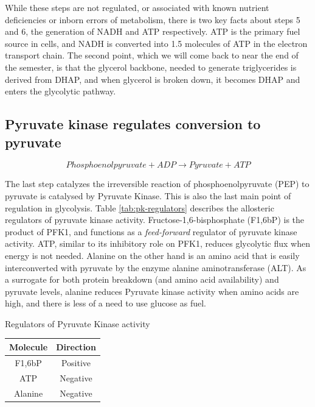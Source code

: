 \documentclass{tufte-handout}
\begin{document}
While these steps are not regulated, or associated with known nutrient deficiencies or inborn errors of metabolism, there is two key facts about steps 5 and 6, the generation of NADH and ATP respectively.  ATP is the primary fuel source in cells, and NADH is converted into 1.5 molecules of ATP in the electron transport chain.  The second point, which we will come back to near the end of the semester, is that the glycerol backbone, needed to generate triglycerides is derived from DHAP, and when glycerol is broken down, it becomes DHAP and enters the glycolytic pathway.

\subsection{Pyruvate kinase regulates conversion to pyruvate}

\begin{equation}
Phosphoenolpyruvate + ADP \rightarrow Pyruvate + ATP
\end{equation}

The last step catalyzes the irreversible reaction of phosphoenolpyruvate (PEP) to pyruvate is catalysed by Pyruvate Kinase.  This is also the last main point of regulation in glycolysis.  Table \ref{tab:pk-regulators} describes the allosteric regulators of pyruvate kinase activity.  Fructose-1,6-bisphosphate (F1,6bP) is the product of PFK1, and functions as a \emph{feed-forward} regulator of pyruvate kinase activity.  ATP, similar to its inhibitory role on PFK1, reduces glycolytic flux when energy is not needed.  Alanine on the other hand is an amino acid that is easily interconverted with pyruvate by the enzyme alanine aminotransferase (ALT).  As a surrogate for both protein breakdown (and amino acid availability) and pyruvate levels, alanine reduces Pyruvate kinase activity when amino acids are high, and there is less of a need to use glucose as fuel.

\begin{margintable}
\centering
\caption{Regulators of Pyruvate Kinase activity}
\label{tab:pk-regulators}
\begin{tabular}{cc}
\hline
\textbf {Molecule} & \textbf{Direction}  \\
\hline
F1,6bP & Positive \\
ATP & Negative \\
Alanine & Negative \\
\hline
\end{tabular}
\end{margintable}
\end{document}
